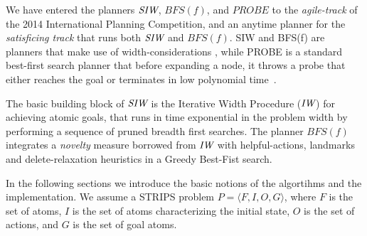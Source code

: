 
We have entered the planners ${\textit{SIW}}$, $BFS(f)$, and $PROBE$ to the
\emph{agile-track} of the 2014 International Planning Competition, and an anytime
planner for the \emph{satisficing track} that runs both ${\textit{SIW}}$ and $BFS(f)$.
SIW and BFS(f) are planners that make use of width-considerations \cite{nir:ecai12}, while PROBE is a standard best-first search planner that before expanding a node, it throws a probe  that
either reaches the goal or terminates in low polynomial time~\cite{nir:icaps11}.

The basic building block of ${\textit{SIW}}$ is the Iterative Width Procedure
(${\textit{IW}}$) for achieving atomic goals, that runs in time exponential in
the problem width by performing a sequence of pruned breadth first
searches.  The planner $BFS(f)$ integrates a \emph{novelty} measure
borrowed from ${\textit{IW}}$ with helpful-actions, landmarks and
delete-relaxation heuristics in a Greedy Best-Fist
search.  

In the following sections we introduce the basic notions of the
algortihms and the implementation. We assume a STRIPS problem $P =
\langle F,I,O,G\rangle$, where $F$ is the set of atoms, $I$ is the set
of atoms characterizing the initial state, $O$ is the set of actions,
and $G$ is the set of goal atoms.
